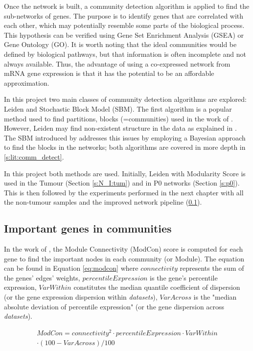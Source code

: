 Once the network is built, a community detection algorithm is applied to find the sub-networks of genes. The purpose is to identify genes that are correlated with each other, which may potentially resemble some parts of the biological process. This hypothesis can be verified using Gene Set Enrichment Analysis (GSEA) or Gene Ontology (GO). It is worth noting that the ideal communities would be defined by biological pathways, but that information is often incomplete and not always available. Thus, the advantage of using a co-expressed network from mRNA gene expression is that it has the potential to be an affordable approximation.


In this project two main classes of community detection algorithms are explored: Leiden and Stochastic Block Model (SBM). The first algorithm is a popular method used to find partitions, blocks (=communities) used in the work of \citet{Care2019-ij}. However, Leiden may find non-existent structure in the data as explained in \citet{Peixoto2021-jx}. The SBM introduced by \citet{Peixoto2019-fg} addresses this issues by employing a Bayesian approach to find the blocks in the networks; both algorithms are covered in more depth in \cref{s:lit:comm_detect}.

In this project both methods are used. Initially, Leiden with Modularity Score is used in the Tumour (Section \ref{s:N_I:tum}) and in P0 networks (Section \ref{s:p0}). This is then followed by the experiments performed in the next chapter with all the non-tumour samples and the improved network pipeline (\ref{}).

\subsection{Important genes in communities}

In the work of \citet{Care2019-ij}, the  Module Connectivity (ModCon) score is computed for each gene to find the important nodes in each community (or Module). The equation can be found in Equation \ref{eq:modcon} where $connectivity$ represents the sum of the genes' edges' weights, $percentileExpression$ is the gene's percentile expression, $VarWithin$ constitutes the median quantile coefficient of dispersion (or the gene expression dispersion within \textit{datasets}), $VarAcross$ is the "median absolute deviation of percentile expression" (or the gene dispersion across \textit{datasets}).

\begin{multline} \label{eq:modcon}
         ModCon = connectivity^2 \cdot percentileExpression \cdot VarWithin \\
         \cdot (100 - VarAcross) / 100
\end{multline}

